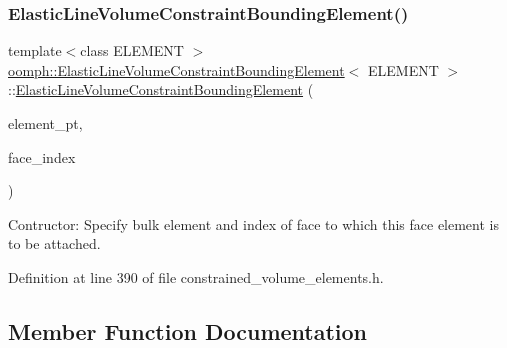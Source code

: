 \subsubsection{\texorpdfstring{Elastic\+Line\+Volume\+Constraint\+Bounding\+Element()}{ElasticLineVolumeConstraintBoundingElement()}}
{\footnotesize\ttfamily template$<$class E\+L\+E\+M\+E\+NT $>$ \\
\hyperlink{classoomph_1_1ElasticLineVolumeConstraintBoundingElement}{oomph\+::\+Elastic\+Line\+Volume\+Constraint\+Bounding\+Element}$<$ E\+L\+E\+M\+E\+NT $>$\+::\hyperlink{classoomph_1_1ElasticLineVolumeConstraintBoundingElement}{Elastic\+Line\+Volume\+Constraint\+Bounding\+Element} (\begin{DoxyParamCaption}\item[{Finite\+Element $\ast$const \&}]{element\+\_\+pt,  }\item[{const int \&}]{face\+\_\+index }\end{DoxyParamCaption})\hspace{0.3cm}{\ttfamily [inline]}}



Contructor\+: Specify bulk element and index of face to which this face element is to be attached. 



Definition at line 390 of file constrained\+\_\+volume\+\_\+elements.\+h.



\subsection{Member Function Documentation}
\mbox{\label{classoomph_1_1ElasticLineVolumeConstraintBoundingElement_a6b9670b4a995765e0b2793a3cab05966}} 
